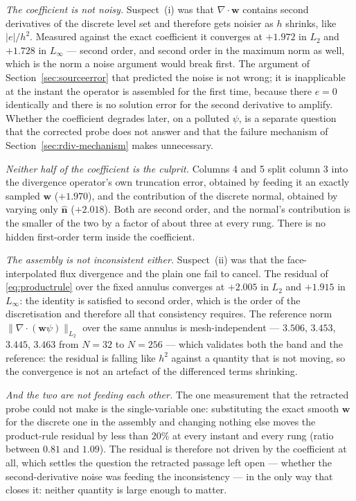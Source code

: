 \documentclass[preprint,3p,11pt]{elsarticle}
\newcommand{\psilev}{\psi}
\newcommand{\nhat}{\hat{\mathbf{n}}}
\begin{document}
\emph{The coefficient is not noisy.} Suspect~(i) was that
$\nabla\cdot\mathbf{w}$ contains second derivatives of the discrete level set and
therefore gets noisier as $h$ shrinks, like $|e|/h^2$. Measured against the exact
coefficient it converges at $+1.972$ in $L_2$ and $+1.728$ in $L_\infty$ --- second
order, and second order in the maximum norm as well, which is the norm a noise
argument would break first. The argument of Section~\ref{sec:sourceerror} that
predicted the noise is not wrong; it is inapplicable at the instant the operator
is assembled for the first time, because there $e = 0$ identically and there is no
solution error for the second derivative to amplify. Whether the coefficient
degrades later, on a polluted $\psilev$, is a separate question that the corrected
probe does not answer and that the failure mechanism of
Section~\ref{sec:rdiv-mechanism} makes unnecessary.

\emph{Neither half of the coefficient is the culprit.} Columns 4 and 5 split
column 3 into the divergence operator's own truncation error, obtained by feeding
it an exactly sampled $\mathbf{w}$ ($+1.970$), and the contribution of the discrete
normal, obtained by varying only $\nhat$ ($+2.018$). Both are second order, and
the normal's contribution is the smaller of the two by a factor of about three at
every rung. There is no hidden first-order term inside the coefficient.

\emph{The assembly is not inconsistent either.} Suspect~(ii) was that the
face-interpolated flux divergence and the plain one fail to cancel. The residual
of \eqref{eq:productrule} over the fixed annulus converges at $+2.005$ in $L_2$
and $+1.915$ in $L_\infty$: the identity is satisfied to second order, which is
the order of the discretisation and therefore all that consistency requires. The
reference norm $\|\nabla\cdot(\mathbf{w}\psilev)\|_{L_2}$ over the same annulus is
mesh-independent --- $3.506$, $3.453$, $3.445$, $3.463$ from $N=32$ to $N=256$ ---
which validates both the band and the reference: the residual is falling like
$h^2$ against a quantity that is not moving, so the convergence is not an artefact
of the differenced terms shrinking.

\emph{And the two are not feeding each other.} The one measurement that the
retracted probe could not make is the single-variable one: substituting the exact
smooth $\mathbf{w}$ for the discrete one in the assembly and changing nothing else
moves the product-rule residual by less than $20\%$ at every instant and every
rung (ratio between $0.81$ and $1.09$). The residual is therefore not driven by
the coefficient at all, which settles the question the retracted passage left open
--- whether the second-derivative noise was feeding the inconsistency --- in the
only way that closes it: neither quantity is large enough to matter.
\end{document}
